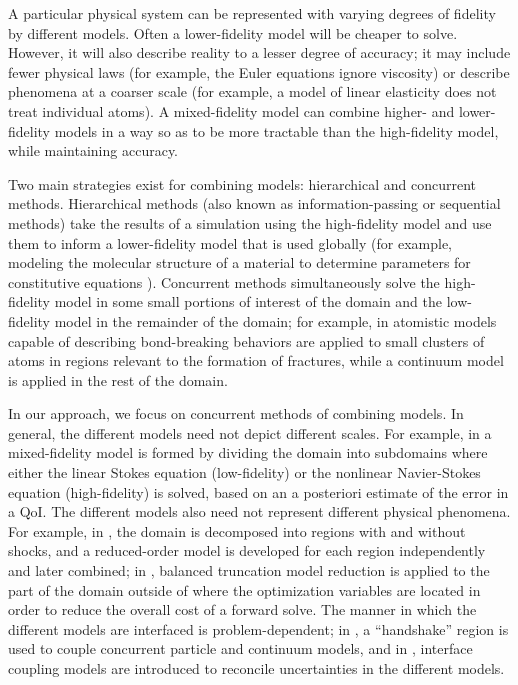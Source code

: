 A particular physical system can be represented with varying degrees of fidelity by different models. Often a lower-fidelity model will be cheaper to solve. However, it will also describe reality to a lesser degree of accuracy; it may include fewer physical laws (for example, the Euler equations ignore viscosity) or describe phenomena at a coarser scale (for example, a model of linear elasticity does not treat individual atoms). A mixed-fidelity model can combine higher- and lower-fidelity models in a way so as to be more tractable than the high-fidelity model, while maintaining accuracy.

Two main strategies exist for combining models: hierarchical and concurrent methods. Hierarchical methods (also known as information-passing or sequential methods) take the results of a simulation using the high-fidelity model and use them to inform a lower-fidelity model that is used globally (for example, modeling the molecular structure of a material to determine parameters for constitutive equations \cite{Haoetal03}). Concurrent methods simultaneously solve the high-fidelity model in some small portions of interest of the domain and the low-fidelity model in the remainder of the domain; for example, in \cite{Khareetal08} atomistic models capable of describing bond-breaking behaviors are applied to small clusters of atoms in regions relevant to the formation of fractures, while a continuum model is applied in the rest of the domain.

In our approach, we focus on concurrent methods of combining models. In general, the different models need not depict different scales. For example, in \cite{vanOpstaletal15} a mixed-fidelity model is formed by dividing the domain into subdomains where either the linear Stokes equation (low-fidelity) or the nonlinear Navier-Stokes equation (high-fidelity) is solved, based on an a posteriori estimate of the error in a QoI. The different models also need not represent different physical phenomena. For example, in \cite{LucKinBer02}, the domain is decomposed into regions with and without shocks, and a reduced-order model is developed for each region independently and later combined; in \cite{AntHein10}, balanced truncation model reduction is applied to the part of the domain outside of where the optimization variables are located in order to reduce the overall cost of a forward solve. The manner in which the different models are interfaced is problem-dependent; in \cite{Abra98, AlexGarTar02}, a ``handshake'' region is used to couple concurrent particle and continuum models, and in \cite{AlexGarTar02}, interface coupling models are introduced to reconcile uncertainties in the different models.

